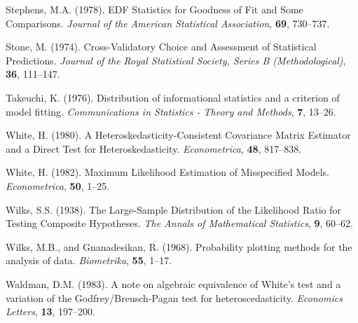 \phantom{a}

\rff Stephens, M.A. (1978).
      EDF Statistics for Goodness of Fit and Some Comparisons.
      {\it Journal of the American Statistical Association},
      {\bf 69}, {730--737}.

\phantom{a}

\rff Stone, M. (1974).
      Cross-Validatory Choice and Assessment of Statistical Predictions.
      {\it Journal of the Royal Statistical Society, Series B (Methodological)},
      {\bf 36}, {111--147}.

\phantom{a}

\rff Takeuchi, K. (1976).
      Distribution of informational statistics and a criterion of model fitting.
      {\it Communications in Statistics - Theory and Methods},
      {\bf 7}, {13--26}.

\phantom{a}

\rff White, H. (1980).
      A Heteroskedasticity-Consistent Covariance Matrix Estimator and a Direct Test for Heteroskedasticity.
      {\it Econometrica},
      {\bf 48}, {817--838}.

\phantom{a}

\rff White, H. (1982).
      Maximum Likelihood Estimation of Misspecified Models.
      {\it Econometrica},
      {\bf 50}, {1--25}.

\phantom{a}

\rff Wilks, S.S. (1938).
      The Large-Sample Distribution of the Likelihood Ratio for Testing Composite Hypotheses.
      {\it The Annals of Mathematical Statistics},
      {\bf 9}, {60--62}.

\phantom{a}

\rff Wilks, M.B., and Gnanadesikan, R. (1968).
      Probability plotting methods for the analysis of data.
      {\it Biometrika},
      {\bf 55}, {1--17}.

\phantom{a}

\rff Waldman, D.M. (1983).
      A note on algebraic equivalence of White's test and a variation of the Godfrey/Breusch-Pagan test for heteroscedasticity.
      {\it Economics Letters},
      {\bf 13}, {197--200}.

